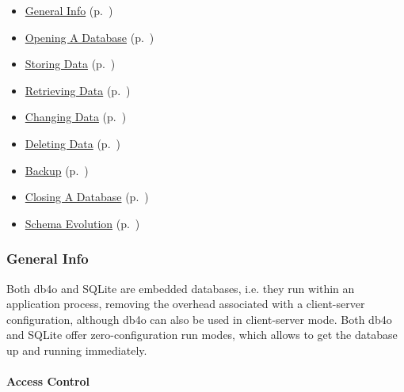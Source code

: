 \begin{itemize}
\item \hyperref[ref:platform-specific-issues-android-general-info]{General Info} (p.~\pageref{ref:platform-specific-issues-android-general-info})
\item \hyperref[ref:platform-specific-issues-android-opening-a-database]{Opening A Database} (p.~\pageref{ref:platform-specific-issues-android-opening-a-database})
\item \hyperref[ref:platform-specific-issues-android-storing-data]{Storing Data} (p.~\pageref{ref:platform-specific-issues-android-storing-data})
\item \hyperref[ref:platform-specific-issues-android-retrieving-data]{Retrieving Data} (p.~\pageref{ref:platform-specific-issues-android-retrieving-data})
\item \hyperref[ref:platform-specific-issues-android-changing-data]{Changing Data} (p.~\pageref{ref:platform-specific-issues-android-changing-data})
\item \hyperref[ref:platform-specific-issues-android-deleting-data]{Deleting Data} (p.~\pageref{ref:platform-specific-issues-android-deleting-data})
\item \hyperref[ref:platform-specific-issues-android-backup]{Backup} (p.~\pageref{ref:platform-specific-issues-android-backup})
\item \hyperref[ref:platform-specific-issues-android-closing-a-database]{Closing A Database} (p.~\pageref{ref:platform-specific-issues-android-closing-a-database})
\item \hyperref[ref:platform-specific-issues-android-schema-evolution]{Schema Evolution} (p.~\pageref{ref:platform-specific-issues-android-schema-evolution})
\end{itemize}

\subsubsection{General Info}
\label{ref:platform-specific-issues-android-general-info}

Both db4o and SQLite are embedded databases, i.e. they run within an application process, removing the overhead associated with a client-server configuration, although db4o can also be used in client-server mode. Both db4o and SQLite offer zero-configuration run modes, which allows to get the database up and running immediately.

\paragraph*{Access Control}


